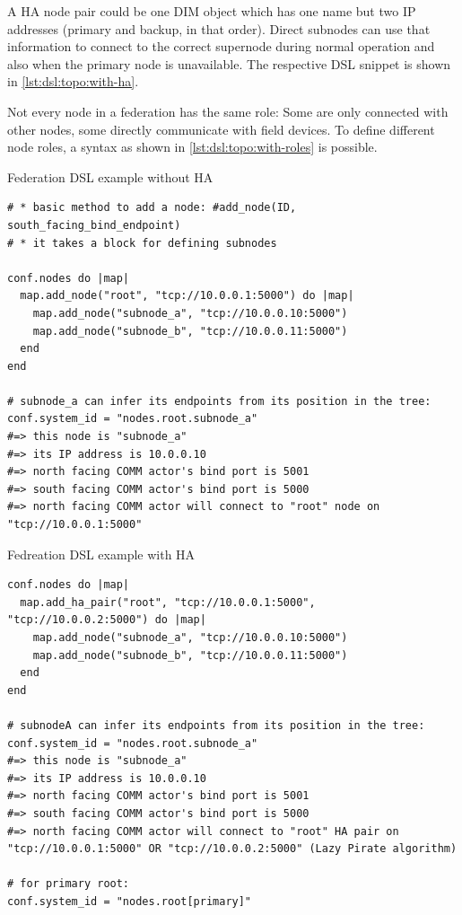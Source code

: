 A HA node pair could be one DIM object which has one name but two IP addresses
(primary and backup, in that order). Direct subnodes can use that information
to connect to the correct supernode during normal operation and also
when the primary node is unavailable. The respective DSL snippet is shown in
\autoref{lst:dsl:topo:with-ha}.

Not every node in a federation has the same role: Some are only connected with other
nodes, some directly communicate with field devices. To define different node roles, a
syntax as shown in \autoref{lst:dsl:topo:with-roles} is possible.

\begin{listing}
	\caption{Federation DSL example without HA}
	\label{lst:dsl:topo:no-ha}
	\begin{verbatim}
# * basic method to add a node: #add_node(ID, south_facing_bind_endpoint)
# * it takes a block for defining subnodes

conf.nodes do |map|
  map.add_node("root", "tcp://10.0.0.1:5000") do |map|
    map.add_node("subnode_a", "tcp://10.0.0.10:5000")
    map.add_node("subnode_b", "tcp://10.0.0.11:5000")
  end
end

# subnode_a can infer its endpoints from its position in the tree:
conf.system_id = "nodes.root.subnode_a"
#=> this node is "subnode_a"
#=> its IP address is 10.0.0.10
#=> north facing COMM actor's bind port is 5001
#=> south facing COMM actor's bind port is 5000
#=> north facing COMM actor will connect to "root" node on "tcp://10.0.0.1:5000"
	\end{verbatim}
\end{listing}

\begin{listing}
	\caption{Fedreation DSL example with HA}
	\label{lst:dsl:topo:with-ha}
	\begin{verbatim}
conf.nodes do |map|
  map.add_ha_pair("root", "tcp://10.0.0.1:5000", "tcp://10.0.0.2:5000") do |map|
    map.add_node("subnode_a", "tcp://10.0.0.10:5000")
    map.add_node("subnode_b", "tcp://10.0.0.11:5000")
  end
end

# subnodeA can infer its endpoints from its position in the tree:
conf.system_id = "nodes.root.subnode_a"
#=> this node is "subnode_a"
#=> its IP address is 10.0.0.10
#=> north facing COMM actor's bind port is 5001
#=> south facing COMM actor's bind port is 5000
#=> north facing COMM actor will connect to "root" HA pair on "tcp://10.0.0.1:5000" OR "tcp://10.0.0.2:5000" (Lazy Pirate algorithm)

# for primary root:
conf.system_id = "nodes.root[primary]"
	\end{verbatim}
\end{listing}

